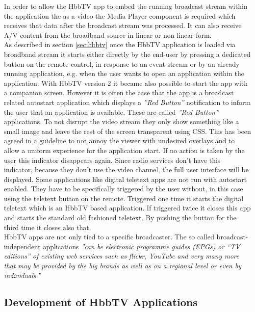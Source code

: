 In order to allow the HbbTV app to embed the running broadcast stream within the application the
as a video the Media Player component is required which receives that data after the broadcast
stream was processed. It can also receive A/V content from the broadband source in linear or non
linear form.\\
As described in section \ref{sec:hbbtv} once the HbbTV application is loaded via broadband stream
it starts either directly by the end-user by pressing a dedicated button on the remote control, in
response to an event stream or by an already running application, e.g. when the user wants to open
an application within the application. With HbbTV version 2 it became also possible to start the
app with a companion screen. However it is often the case that the app is a broadcast related
autostart application which displays a \textit{''Red Button''} notification to inform the user
that an application is available. These are called \textit{''Red Button''} applications. To not
disrupt the video stream they only show something like a small image and leave the rest of the
screen transparent using CSS. This has been agreed in a guideline to not annoy the viewer with
undesired overlays and to allow a uniform experience for the application start. If no action
is taken by the user this indicator disappears again. Since radio services don't have this
indicator, because they don't use the video channel, the full user interface will be displayed.
Some applications like digital teletext apps are not run with autostart enabled. They have
to be specifically triggered by the user without, in this case using the teletext button on
the remote. Triggered one time it starts the digital teletext which is an HbbTV based application.
If triggered twice it closes this app and starts the standard old fashioned teletext. By pushing
the button for the third time it closes also that.\\
HbbTV apps are not only tied to a specific broadcaster. The so called broadcast-independent
applications \textit{''can be electronic programme guides (EPGs) or “TV editions” of existing
web services such as flickr, YouTube and very many more that may be provided by the big brands
as well as on a regional level or even by individuals.''}\cite{biapps}

\subsection{Development of HbbTV Applications\label{sec:devofhbbtv}}

